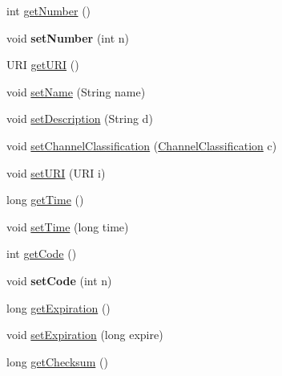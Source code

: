 \begin{DoxyCompactItemize}
\item 
int \hyperlink{classgov_1_1fnal_1_1ppd_1_1dd_1_1channel_1_1ChannelImpl_a9d5fbb02930a03147b1240db1371c57a}{get\-Number} ()
\item 
\hypertarget{classgov_1_1fnal_1_1ppd_1_1dd_1_1channel_1_1ChannelImpl_af4d05e867b9f3f62c56b5d06f69889f7}{void {\bfseries set\-Number} (int n)}\label{classgov_1_1fnal_1_1ppd_1_1dd_1_1channel_1_1ChannelImpl_af4d05e867b9f3f62c56b5d06f69889f7}

\item 
U\-R\-I \hyperlink{classgov_1_1fnal_1_1ppd_1_1dd_1_1channel_1_1ChannelImpl_a9004e74f2476cb8f7a4d56285d49ba45}{get\-U\-R\-I} ()
\item 
void \hyperlink{classgov_1_1fnal_1_1ppd_1_1dd_1_1channel_1_1ChannelImpl_a0d227de9590cc6ce476497c8f919f2e4}{set\-Name} (String name)
\item 
void \hyperlink{classgov_1_1fnal_1_1ppd_1_1dd_1_1channel_1_1ChannelImpl_abb1380a6a0403aa8b3603d39cdc38ea4}{set\-Description} (String d)
\item 
void \hyperlink{classgov_1_1fnal_1_1ppd_1_1dd_1_1channel_1_1ChannelImpl_a4e64970f8cfaf5c9fabe173feb40a0d4}{set\-Channel\-Classification} (\hyperlink{classgov_1_1fnal_1_1ppd_1_1dd_1_1changer_1_1ChannelClassification}{Channel\-Classification} c)
\item 
void \hyperlink{classgov_1_1fnal_1_1ppd_1_1dd_1_1channel_1_1ChannelImpl_a685f3caf0f4e3d501e68c55794f38111}{set\-U\-R\-I} (U\-R\-I i)
\item 
long \hyperlink{classgov_1_1fnal_1_1ppd_1_1dd_1_1channel_1_1ChannelImpl_aa2d5c561810b90f2401e5da2c1972774}{get\-Time} ()
\item 
void \hyperlink{classgov_1_1fnal_1_1ppd_1_1dd_1_1channel_1_1ChannelImpl_ae5c03927d8473ecae11b4002395da886}{set\-Time} (long time)
\item 
int \hyperlink{classgov_1_1fnal_1_1ppd_1_1dd_1_1channel_1_1ChannelImpl_ab7c659985471afada6dece70c1d75b61}{get\-Code} ()
\item 
\hypertarget{classgov_1_1fnal_1_1ppd_1_1dd_1_1channel_1_1ChannelImpl_aa13af9f5763f97581ec533f91e380906}{void {\bfseries set\-Code} (int n)}\label{classgov_1_1fnal_1_1ppd_1_1dd_1_1channel_1_1ChannelImpl_aa13af9f5763f97581ec533f91e380906}

\item 
long \hyperlink{classgov_1_1fnal_1_1ppd_1_1dd_1_1channel_1_1ChannelImpl_af509fea6b9340b85522025b70cc4e64e}{get\-Expiration} ()
\item 
void \hyperlink{classgov_1_1fnal_1_1ppd_1_1dd_1_1channel_1_1ChannelImpl_a9428ab2c22c4272e97c2251eb38e8b2e}{set\-Expiration} (long expire)
\item 
long \hyperlink{classgov_1_1fnal_1_1ppd_1_1dd_1_1channel_1_1ChannelImpl_abfc920cea3e8ce7156aad3d9a87213c8}{get\-Checksum} ()
\end{DoxyCompactItemize}
